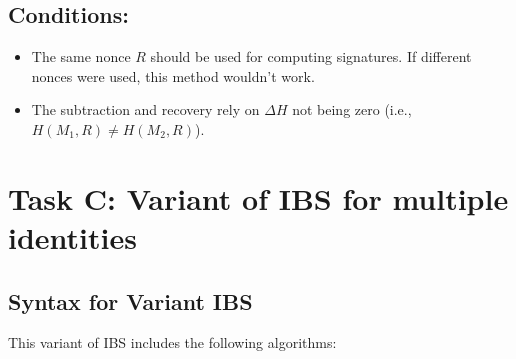 \documentclass[12pt]{article}
\begin{document}
\subsection{Conditions:}
\begin{itemize}
    \item The same nonce \(R\) should be used for computing signatures. If different nonces were used, this method wouldn't work.
    \item The subtraction and recovery rely on \(\Delta H\) not being zero (i.e., \(H(M_1, R) \neq H(M_2, R)\)).
\end{itemize}

\section{Task C: Variant of IBS for multiple identities}



\subsection{Syntax for Variant IBS}

This variant of IBS includes the following algorithms:
\end{document}

